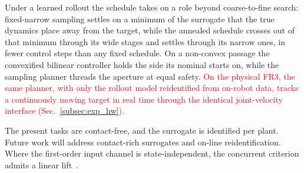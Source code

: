 \documentclass[letterpaper,10pt,conference]{ieeeconf}
\newcommand{\nd}[1]{\textcolor{red}{#1}}
\begin{document}
Under a learned rollout the schedule takes on a role beyond coarse-to-fine search: fixed-narrow sampling settles on a minimum of the surrogate that the true dynamics place away from the target, while the annealed schedule crosses out of that minimum through its wide stages and settles through its narrow ones, in fewer control steps than any fixed schedule.
On a non-convex passage the convexified bilinear controller holds the side its nominal starts on, while the sampling planner threads the aperture at equal safety.
\nd{On the physical FR3, the same planner, with only the rollout model reidentified from on-robot data, tracks a continuously moving target in real time through the identical joint-velocity interface (Sec.~\ref{subsec:exp_hw}).}

The present tasks are contact-free, and the surrogate is identified per plant.
Future work will address contact-rich surrogates and on-line reidentification.
Where the first-order input channel is state-independent, the concurrent criterion admits a linear lift~\cite{kim2026bilinear}.



\end{document}
